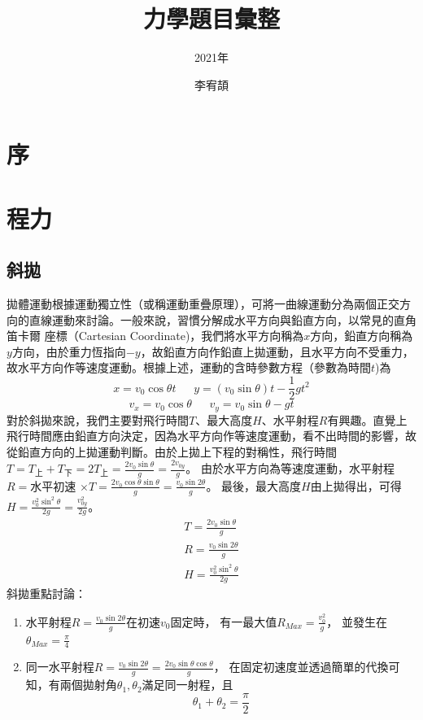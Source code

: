 \documentclass[cn,10pt,math=newtx,chinesefont=founder]{../elegantbook}
\title{力學題目彙整}
\subtitle{2021年}
\author{李宥頡}
\institute{National Taiwan University}
\begin{document}
\maketitle
\frontmatter

\chapter*{序}
\tableofcontents

\mainmatter

\chapter{程力}
\section{斜拋}
拋體運動根據運動獨立性（或稱運動重疊原理），可將一曲線運動分為兩個正交方向的直線運動來討論。一般來說，習慣分解成水平方向與鉛直方向，以常見的直角笛卡爾
座標（Cartesian Coordinate)，我們將水平方向稱為$x$方向，鉛直方向稱為$y$方向，由於重力恆指向$-y$，故鉛直方向作鉛直上拋運動，且水平方向不受重力，
故水平方向作等速度運動。根據上述，運動的含時參數方程（參數為時間$t$)為
\begin{equation}\label{1.1}
    x = v_0 \cos\theta t\ \ \ \ \ \ \ y = (v_0 \sin\theta)t -\frac{1}{2}gt^2
\end{equation}
\begin{equation}
    v_x = v_0 \cos\theta \ \ \ \ \ \ \ v_y = v_0 \sin\theta - gt
\end{equation}
對於斜拋來說，我們主要對飛行時間$T$、最大高度$H$、水平射程$R$有興趣。直覺上飛行時間應由鉛直方向決定，因為水平方向作等速度運動，看不出時間的影響，故
從鉛直方向的上拋運動判斷。由於上拋上下程的對稱性，飛行時間$T=T_{上}+T_{下}=2T_{上}=\frac{2v_0 \sin\theta}{g}=\frac{2v_{0y}}{g}$。
由於水平方向為等速度運動，水平射程$R = $水平初速 $\times T = \frac{2 v_0 \cos\theta \sin\theta}{g} = \frac{v_0 \sin 2\theta}{g}$。
最後，最大高度$H$由上拋得出，可得$H=\frac{v_0^2 \sin^2\theta}{2g}=\frac{v_{0y}^2}{2g}$。\\
\begin{equation}
\begin{array}{l}
    T = \frac{2v_0 \sin\theta}{g} \\
    R = \frac{v_0 \sin 2\theta}{g} \\
    H = \frac{v_0^2 \sin^2\theta}{2g}
\end{array}
\end{equation}
斜拋重點討論：
\begin{enumerate}
    \item 水平射程$R = \frac{v_0 \sin 2\theta}{g}$在初速$v_0$固定時，
          有一最大值$R_{Max}=\frac{v_0^2}{g}$，
          並發生在$\theta_{Max}=\frac{\pi}{4}$
    \item 同一水平射程$R = \frac{v_0 \sin 2\theta}{g}=\frac{2v_0 \sin \theta \cos \theta}{g}$，
          在固定初速度並透過簡單的代換可知，有兩個拋射角$\theta_1 , \theta_2$滿足同一射程，且
          \begin{equation} \label{1.4}
            \theta_1+\theta_2 = \frac{\pi}{2}
          \end{equation}
\end{enumerate}
\end{document}
